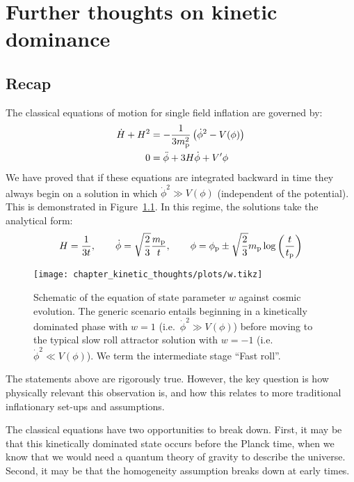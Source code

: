 \chapter{Further thoughts on kinetic dominance}
\label{chap:kt}

\section{Recap}
The classical equations of motion for single field inflation are
governed by:
%
\begin{align}
  \dot{H} + H^2 
  &= - \frac{1}{3m_{\mathrm{p}}^2}\left( \dot{\phi}^2 - V(\phi)\right)
  \label{eqn:kt:raychaudhuri}
  \\
  0 &= \ddot{\phi} + 3H\dot\phi + V^\prime{\phi}
  \label{eqn:kt:kleingordon}
\end{align}
%
We have proved that if these equations are integrated backward in time
they always begin on a solution in which $\dot\phi^2\gg V(\phi)$
(independent of the potential). This is demonstrated in
Figure~\ref{fig:kt:w}. In this regime, the solutions take the analytical
form:
\begin{equation}
  H = \frac{1}{3t},\qquad \dot{\phi} 
  = \sqrt{\frac 2 3}\frac{m_{\mathrm{p}}}{t}, \qquad \phi 
  = \phi_{\mathrm{p}} \pm \sqrt{\frac 2 3}m_{\mathrm{p}} \log\left( \frac t {t_{\mathrm{p}}} \right)
\end{equation}
\begin{figure}[tp]
  \texttt{[image: chapter\_kinetic\_thoughts/plots/w.tikz]}
  \caption{%
    Schematic of the equation of state parameter $w$ against cosmic
    evolution. The generic scenario entails beginning in a kinetically
    dominated phase with $w=1$ (i.e.\ $\dot{\phi}^2\gg V(\phi)$)
    before moving to the typical slow roll attractor solution with
    $w=-1$ (i.e.\ $\dot{\phi}^2 \ll V(\phi)$). We term the
    intermediate stage ``Fast roll''.\label{fig:kt:w}
  }
\end{figure}

The statements above are rigorously true. However, the key question is how physically relevant this observation is, and how this relates to more traditional inflationary set-ups and assumptions.

The classical equations have two opportunities to break down. First, it may be that this kinetically dominated state occurs before the Planck time, when we know that we would need a quantum theory of gravity to describe the universe. Second, it may be that the homogeneity assumption breaks down at early times.

